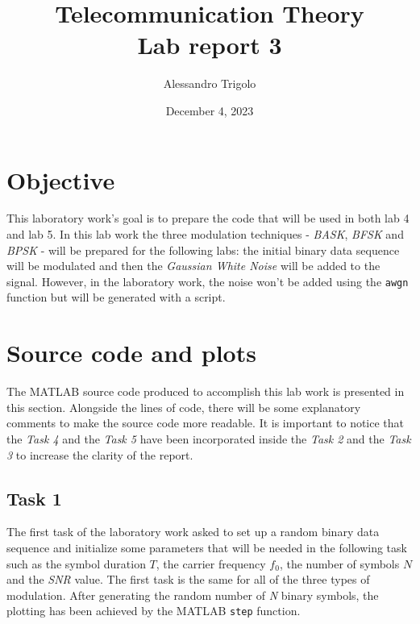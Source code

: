 \title{\vspace{160px} \textbf{\huge{Telecommunication Theory}} \\\vspace{17.5px} \LARGE{Lab report 3}  \vspace{10px}}
\author{Alessandro Trigolo}
\date{December 4, 2023}


\maketitle \newpage

\section*{Objective}
This laboratory work's goal is to prepare the code that will be used in both lab 4 and lab 5. In this lab work the three modulation techniques - \textsl{BASK}, \textsl{BFSK} and \textsl{BPSK} - will be prepared for the following labs: the initial binary data sequence will be modulated and then the \textsl{Gaussian White Noise} will be added to the signal. However, in the laboratory work, the noise won't be added using the \texttt{awgn} function but will be generated with a script.

\section*{Source code and plots}
\lstset{style = MatLab}
The MATLAB source code produced to accomplish this lab work is presented in this section. Alongside the lines of code, there will be some explanatory comments to make the source code more readable. It is important to notice that the \textsl{Task 4} and the \textsl{Task 5} have been incorporated inside the \textsl{Task 2} and the \textsl{Task 3} to increase the clarity of the report.

\subsection*{Task 1}
The first task of the laboratory work asked to set up a random binary data sequence and initialize some parameters that will be needed in the following task such as the symbol duration $T$, the carrier frequency $f_0$, the number of symbols $N$ and the \textsl{SNR} value. The first task is the same for all of the three types of modulation. After generating the random number of \textit{N} binary symbols, the plotting has been achieved by the MATLAB \texttt{step} function. 


